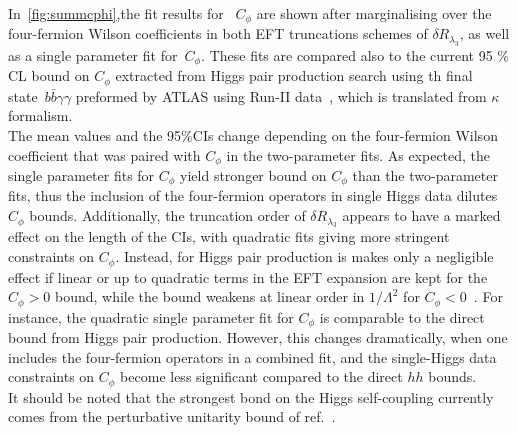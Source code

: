 	\par
	 In~\autoref{fig:summcphi},the fit results for~ $C_\phi$ are shown after marginalising over the four-fermion Wilson coefficients in both EFT truncations schemes of $\delta R_{\lambda_3}$, as well as a single parameter fit for~$C_{\phi}$. These fits are compared also to the current 95 \% CL bound on $C_\phi$ extracted from Higgs pair production search using th final state~$b\bar{b} \gamma \gamma$ preformed by ATLAS using Run-II data~\cite{ATLAS:2021jki}, which is translated from $\kappa$ formalism.\\ The mean values and the 95\%CIs change depending on the four-fermion Wilson coefficient that was paired with $C_\phi$ in the two-parameter fits. As expected, the single parameter fits for $C_\phi$ yield stronger bound on $C_\phi$ than the two-parameter fits, thus the inclusion of the four-fermion operators in single Higgs data dilutes $C_\phi$ bounds.  Additionally, the truncation order of  $\delta R_{\lambda_3}$ appears to have a marked effect on the length of the CIs, with quadratic fits giving more stringent constraints on $C_\phi$. Instead, for Higgs pair production  is makes only a negligible effect  if linear or up to quadratic terms in the EFT expansion are kept  for the $C_\phi>0$ bound, while the bound weakens at linear order in $1/\Lambda^2$ for $C_\phi<0$~\cite{IML}. For instance, the quadratic single parameter fit for $C_\phi$ is comparable to the direct bound from Higgs pair production. However, this changes dramatically, when one includes the four-fermion operators in a combined fit, and the single-Higgs data constraints on $C_\phi$ become less significant compared to the direct $hh$ bounds. \\
	It should be noted that the strongest bond on the Higgs self-coupling currently comes from the perturbative unitarity bound of ref.~\cite{DiLuzio:2017tfn}.
